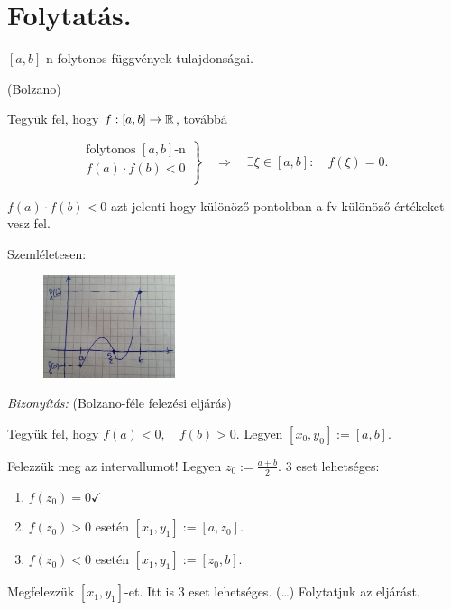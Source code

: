 \documentclass[a4paper,11.5pt]{article}
\begin{document}
	\section{Folytatás.}
	\begin{revision}
		$[a,b]$-n folytonos függvények tulajdonságai.
	\end{revision}
	\begin{theorem}
		(Bolzano)
		
		Tegyük fel, hogy $f:[a,b]\to\mathbb{R}$, továbbá
		
		\[\left.\begin{gathered}
			\text{folytonos } [a,b]\text{-n}\\
			f(a)\cdot f(b)<0\\
		\end{gathered}\right\}\quad \Rightarrow\quad \exists\xi\in[a,b]:\quad f(\xi)=0. \]
		\begin{note}
			$f(a)\cdot f(b) < 0$ azt jelenti hogy különöző pontokban a fv különöző értékeket vesz fel.
		\end{note}
		Szemléletesen:
		
		\begin{figure}[!h]
			\centering
			\includegraphics[height=3cm]{kepek/bolzano_theorem.jpg}
			\caption{}\label{fig_bolzano}
		\end{figure}
		\textit{Bizonyítás:} (Bolzano-féle felezési eljárás)
		
		Tegyük fel, hogy $f(a)<0,\quad  f(b)>0.$ \quad Legyen $[x_0, y_0]:=[a,b]$.
		
		\medskip
		Felezzük meg az intervallumot! Legyen $z_0:=\frac{a+b}{2}$. 3 eset lehetséges:
		\begin{enumerate}
			\item $f(z_0)=0 \checkmark$
			\item $f(z_0)>0$ esetén $[x_1,y_1]:=[a,z_0]$.
			\item $f(z_0)<0$ esetén $[x_1,y_1]:=[z_0,b].$
		\end{enumerate}
		Megfelezzük $[x_1,y_1]$-et. Itt is 3 eset lehetséges. (\ldots) Folytatjuk az eljárást.
		

\end{theorem}
\end{document}
